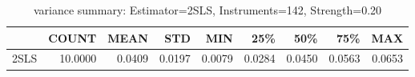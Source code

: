 \begin{table}[ht]
\centering
\caption{variance summary: Estimator=2SLS, Instruments=142, Strength=0.20}
\begin{tabular}{lrrrrrrrr}
\toprule
 & COUNT & MEAN & STD & MIN & 25\% & 50\% & 75\% & MAX \\
\midrule
2SLS & 10.0000 & 0.0409 & 0.0197 & 0.0079 & 0.0284 & 0.0450 & 0.0563 & 0.0653 \\
\bottomrule
\end{tabular}
\end{table}
